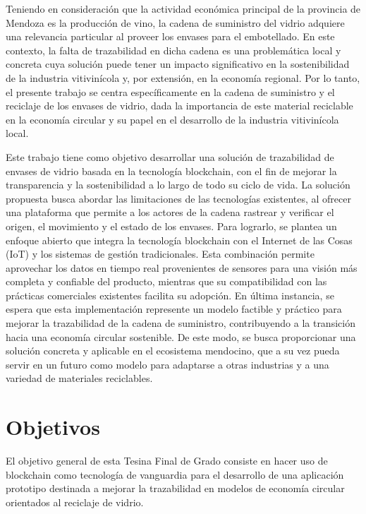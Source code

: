 Teniendo en consideración que la actividad económica principal de la provincia de Mendoza es la producción de vino, la cadena de suministro del vidrio adquiere una relevancia particular al proveer los envases para el embotellado. En este contexto, la falta de trazabilidad en dicha cadena es una problemática local y concreta cuya solución puede tener un impacto significativo en la sostenibilidad de la industria vitivinícola y, por extensión, en la economía regional. Por lo tanto, el presente trabajo se centra específicamente en la cadena de suministro y el reciclaje de los envases de vidrio, dada la importancia de este material reciclable en la economía circular y su papel en el desarrollo de la industria vitivinícola local.

Este trabajo tiene como objetivo desarrollar una solución de trazabilidad de envases de vidrio basada en la tecnología blockchain, con el fin de mejorar la transparencia y la sostenibilidad a lo largo de todo su ciclo de vida. La solución propuesta busca abordar las limitaciones de las tecnologías existentes, al ofrecer una plataforma que permite a los actores de la cadena rastrear y verificar el origen, el movimiento y el estado de los envases. Para lograrlo, se plantea un enfoque abierto que integra la tecnología blockchain con el Internet de las Cosas (IoT) y los sistemas de gestión tradicionales. Esta combinación permite aprovechar los datos en tiempo real provenientes de sensores para una visión más completa y confiable del producto, mientras que su compatibilidad con las prácticas comerciales existentes facilita su adopción. En última instancia, se espera que esta implementación represente un modelo factible y práctico para mejorar la trazabilidad de la cadena de suministro, contribuyendo a la transición hacia una economía circular sostenible. De este modo, se busca proporcionar una solución concreta y aplicable en el ecosistema mendocino, que a su vez pueda servir en un futuro como modelo para adaptarse a otras industrias y a una variedad de materiales reciclables.

\section{Objetivos}

El objetivo general de esta Tesina Final de Grado consiste en hacer uso de blockchain como tecnología de vanguardia para el desarrollo de una aplicación prototipo destinada a mejorar la trazabilidad en modelos de economía circular orientados al reciclaje de vidrio.

